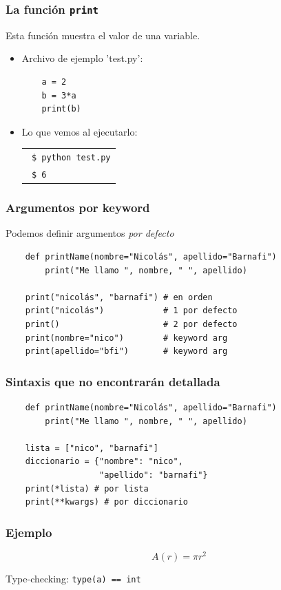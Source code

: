 \documentclass[14pt,aspectratio=169,xcolor=dvipsnames]{beamer}
\begin{document}
\begin{frame}[fragile]\frametitle{La función \texttt{print}}
Esta función muestra el valor de una variable. 
\begin{itemize}
    \item Archivo de ejemplo 'test.py':
    \begin{verbatim}
    a = 2
    b = 3*a
    print(b)
    \end{verbatim}
    \item Lo que vemos al ejecutarlo: 

        \begin{tabular}{l}
            \texttt{ \$ python test.py} \\
            \texttt{ \$ 6}
        \end{tabular}
\end{itemize}

\end{frame}
\begin{frame}[fragile]\frametitle{Argumentos por keyword}
    Podemos definir argumentos \emph{por defecto}
    \begin{verbatim}
    def printName(nombre="Nicolás", apellido="Barnafi")
        print("Me llamo ", nombre, " ", apellido)

    print("nicolás", "barnafi") # en orden
    print("nicolás")            # 1 por defecto
    print()                     # 2 por defecto
    print(nombre="nico")        # keyword arg
    print(apellido="bfi")       # keyword arg
    \end{verbatim}
\end{frame}
\begin{frame}[fragile]\frametitle{Sintaxis que no encontrarán detallada}
    \begin{verbatim}
    def printName(nombre="Nicolás", apellido="Barnafi")
        print("Me llamo ", nombre, " ", apellido)

    lista = ["nico", "barnafi"]
    diccionario = {"nombre": "nico", 
                   "apellido": "barnafi"}
    print(*lista) # por lista
    print(**kwargs) # por diccionario
    \end{verbatim}

\end{frame}
\begin{frame}\frametitle{Ejemplo}

$$ A(r) = \pi r^2 $$

\vspace{1cm}
\pause Type-checking: \texttt{type(a) == int}
\end{frame}
\end{document}
